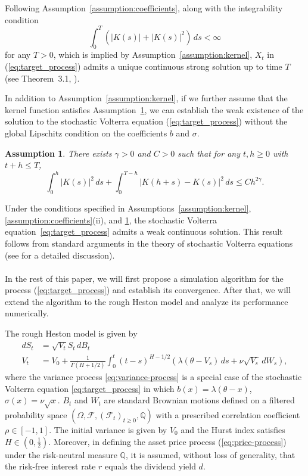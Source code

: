 \documentclass[11pt]{article}%
\newtheorem{assumption}{Assumption}
\theoremstyle{definition}
\begin{document}
Following Assumption~\ref{assumption:coefficients}, along with the integrability condition 
\begin{equation}
    \int_{0}^{T} \left(|K(s)| + |K(s)|^2\right)\,ds < \infty\label{eq:integrability_condition}
\end{equation}
for any \(T>0\), which is implied by Assumption~\ref{assumption:kernel}, \(X_t\) in (\ref{eq:target_process}) admits a unique continuous strong solution up to time \(T\) (see Theorem~3.1, \cite{XinchengZhang2010}). 

In addition to Assumption~\ref{assumption:kernel}, if we further assume that the kernel function satisfies Assumption~\ref{assumption:K_additional}, we can establish the weak existence of the solution to the stochastic Volterra equation (\ref{eq:target_process}) without the global Lipschitz condition on the coefficients \(b\) and \(\sigma\).

\begin{assumption}\label{assumption:K_additional}
    There exists \(\gamma > 0\) and \(C > 0\) such that for any \(t,h\ge 0\) with \(t+h\le T\), \[
    \int_{0}^{h} |K(s)|^2\,ds + \int_{0}^{T-h} |K(h+s) - K(s)|^2\,ds \le C h^{2\gamma}.
    \]
\end{assumption}

Under the conditions specified in Assumptions~\ref{assumption:kernel}, \ref{assumption:coefficients}(ii), and \ref{assumption:K_additional}, the stochastic Volterra equation~\eqref{eq:target_process} admits a weak continuous solution. This result follows from standard arguments in the theory of stochastic Volterra equations (see \cite{abijaber2018} for a detailed discussion).

\paragraph{}In the rest of this paper, we will first propose a simulation algorithm for the process (\ref{eq:target_process}) and establish its convergence. After that, we will extend the algorithm to the rough Heston model and analyze its performance numerically.

The rough Heston model is given by
\begin{align}
    dS_t &= \sqrt{V_t}S_t\,dB_t \label{eq:price-process} \\
    V_t &= V_0 + \frac{1}{\Gamma(H+1/2)} \int_{0}^{t} (t-s)^{H-1/2} \left(\lambda(\theta - V_s)\,ds + \nu \sqrt{V_s}\,dW_s\right), \label{eq:variance-process}
\end{align}
where the variance process \eqref{eq:variance-process} is a special case of the stochastic Volterra equation \eqref{eq:target_process} in which \(b(x)=\lambda(\theta-x)\), \(\sigma(x)=\nu\sqrt{x}\). \(B_t\) and \(W_t\) are standard Brownian motions defined on a filtered probability space \((\Omega,\mathcal{F},(\mathcal{F}_t)_{t\ge 0},\mathbb{Q})\) with a prescribed correlation coefficient \(\rho \in [-1,1]\). The initial variance is given by \(V_0\) and the Hurst index satisfies \(H\in (0,\tfrac{1}{2})\). Moreover, in defining the asset price process (\ref{eq:price-process}) under the risk-neutral measure \(\mathbb{Q}\), it is assumed, without loss of generality, that the risk-free interest rate \(r\) equals the dividend yield \(d\).
\end{document}
